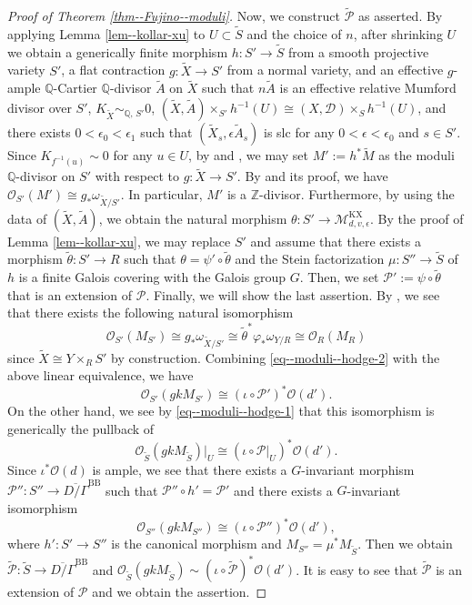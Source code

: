 \documentclass[12pt,twoside]{amsart}
\theoremstyle{definition}
\begin{document}
\begin{proof}[Proof of Theorem \ref{thm--Fujino--moduli}]
Now, we construct $\widetilde{\mathcal{P}}$ as asserted.
By applying Lemma \ref{lem--kollar-xu} to $U\subset\tilde{S}$ and  the choice of $n$, after shrinking $U$ we obtain a generically finite morphism $h\colon S'\to \tilde{S}$ from a smooth projective variety $S'$, a flat contraction $g\colon \tilde{X}\to S'$ from a normal variety, and an effective $g$-ample $\mathbb{Q}$-Cartier $\mathbb{Q}$-divisor $\tilde{A}$ on $\tilde{X}$ such that $n\tilde{A}$ is an effective relative Mumford divisor over $S'$, $K_{\tilde{X}}\sim_{\mathbb{Q},\,S'}0$, $(\tilde{X},\tilde{A})\times_{S'}h^{-1}(U)\cong(X,\mathcal{D})\times_Sh^{-1}(U)$, and there exists $0<\epsilon_0<\epsilon_1$ such that $(\tilde{X}_s,\epsilon\tilde{A}_s)$ is slc for any $0<\epsilon<\epsilon_0$ and $s\in S'$. 
Since $K_{f^{-1}(u)}\sim0$ for any $u \in U$, by \cite[Proposition 3.1]{Am} and \cite[proof of Lemma 3.5]{birkar-compl}, we may set $M':=h^*\tilde{M}$ as the moduli $\mathbb{Q}$-divisor on $S'$ with respect to $g\colon \tilde{X}\to S'$. 
By \cite[Lemma 5.2]{A} and its proof, we have $\mathcal{O}_{S'}(M')\cong g_*\omega_{\tilde{X}/S'}$. In particular, $M'$ is a $\mathbb{Z}$-divisor.
Furthermore, by using the data of $(\tilde{X},\tilde{A})$, we obtain the natural morphism $\theta\colon S'\to \mathcal{M}^{\mathrm{KX}}_{d,v,\epsilon}$.
By the proof of Lemma \ref{lem--kollar-xu}, we may replace $S'$ and assume that there exists a morphism $\tilde{\theta}\colon S'\to R$ such that $\theta=\psi'\circ\tilde{\theta}$ and the Stein factorization $\mu\colon S''\to \tilde{S}$ of $h$ is a finite Galois covering with the Galois group $G$.  
Then, we set $\mathcal{P}':=\psi\circ\tilde{\theta}$ that is an extension of $\mathcal{P}$.
Finally, we will show the last assertion.
By \cite[Corollary 2.69]{kollar-moduli}, we see that there exists the following natural isomorphism
\[
\mathcal{O}_{S'}(M_{S'})\cong g_*\omega_{\tilde{X}/S'}\cong \tilde{\theta}^*\varphi_*\omega_{Y/R}\cong \mathcal{O}_R(M_R)
\]
since $\tilde{X}\cong Y\times_RS'$ by construction.
Combining \eqref{eq--moduli--hodge-2} with the above linear equivalence, we have 
\[
\mathcal{O}_{S'}(gkM_{S'})\cong(\iota\circ\mathcal{P}')^*\mathcal{O}(d'). 
\]
On the other hand, we see by \eqref{eq--moduli--hodge-1} that this isomorphism is generically the pullback of 
\[
\mathcal{O}_{\tilde{S}}(gkM_{\tilde{S}})|_U\cong (\iota\circ\mathcal{P}|_{U})^*\mathcal{O}(d').
\]
Since $\iota^*\mathcal{O}(d)$ is ample, we see that there exists a $G$-invariant morphism $\mathcal{P}''\colon S''\to \overline{D/\Gamma}^{\mathrm{BB}}$ such that $\mathcal{P}''\circ h'=\mathcal{P}'$ and there exists a $G$-invariant isomorphism 
\[
\mathcal{O}_{S''}(gkM_{S''})\cong(\iota\circ\mathcal{P}'')^*\mathcal{O}(d'),
\]
where $h'\colon S'\to S''$ is the canonical morphism and $M_{S''}=\mu^*M_{\tilde{S}}$.
Then we obtain $\widetilde{\mathcal{P}}\colon \tilde{S}\to \overline{D/\Gamma}^{\mathrm{BB}}$ and $\mathcal{O}_{\tilde{S}}(gkM_{\tilde{S}})\sim(\iota\circ\widetilde{\mathcal{P}})^*\mathcal{O}(d')$.
It is easy to see that $\widetilde{\mathcal{P}}$ is an extension of $\mathcal{P}$ and we obtain the assertion.
\end{proof}
\end{document}

